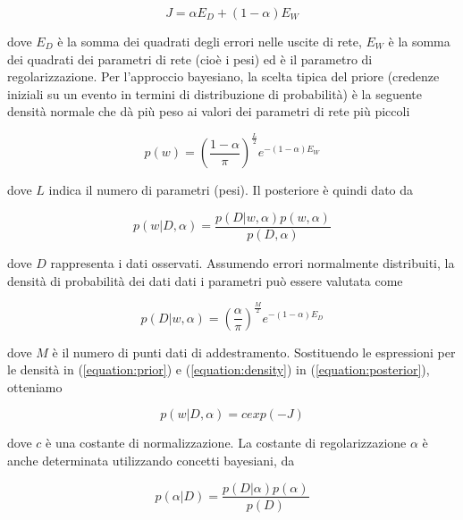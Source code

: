 \documentclass[12pt,a4paper]{report}
\begin{document}
\begin{equation}
{\displaystyle J =\alpha E_D + (1 - \alpha)E_W}
\end{equation}

dove $E_D$ è la somma dei quadrati degli errori nelle uscite di rete, $E_W$ è la somma dei quadrati dei parametri di rete (cioè i pesi) ed è il parametro di regolarizzazione.
Per l'approccio bayesiano, la scelta tipica del priore (credenze iniziali su un evento in termini di distribuzione di probabilità) è la seguente densità normale che dà più peso ai valori dei parametri di rete più piccoli

\begin{equation}
{\displaystyle p(w) = \left( \frac{1 - \alpha}{\pi} \right)^{\frac{L}{2}} e^{-(1 - \alpha)E_W}}
\label{equation:prior}
\end{equation}

dove $L$ indica il numero di parametri (pesi). Il posteriore è quindi dato da

\begin{equation}
{ \displaystyle p(w \vert D, \alpha) = \frac{p(D \vert w, \alpha)p(w, \alpha)}{p(D, \alpha)} }
\label{equation:posterior}
\end{equation}

dove $D$ rappresenta i dati osservati. Assumendo errori normalmente distribuiti, la densità di probabilità dei dati dati i parametri può essere valutata come

\begin{equation}
{ \displaystyle p(D \vert w, \alpha) = \left( \frac{\alpha}{\pi} \right)^{\frac{M}{2}}  e^{-(1 - \alpha)E_D} }
\label{equation:density}
\end{equation}

dove $M$ è il numero di punti dati di addestramento. Sostituendo le espressioni per le densità in (\ref{equation:prior}) e (\ref{equation:density}) in (\ref{equation:posterior}), otteniamo

\begin{equation}
{ \displaystyle p(w \vert D, \alpha) = c exp(-J) }
\label{equation:sostitution}
\end{equation}

dove $c$ è una costante di normalizzazione. La costante di regolarizzazione $\alpha$ è anche determinata utilizzando concetti bayesiani, da

\begin{equation}
{ \displaystyle p(\alpha \vert D) = \frac{p(D \vert \alpha)p(\alpha)}{p(D)} }
\label{equation:constant}
\end{equation}
\end{document}
